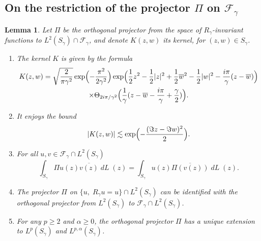 \documentclass[10pt]{amsart}
\DeclareMathOperator{\dL}{\mathit{dL}}
\newtheorem{lemme}[theorem]{Lemma}
\theoremstyle{definition}
\let\EE\exp
\let\ov\overline
\let\Subsection\subsection\let\Subsubsection\subsubsection
\begin{document}
\Subsection{On the restriction of the projector $\Pi$ on $\mathcal{F}_\gamma$}

\begin{lemme}\label{lemme_extension} Let $\Pi$ be the orthogonal projector from the space of $R_\gamma$-invariant functions to ${L^2(S_\gamma) \cap \mathcal{F}_{\gamma}}$, and denote $K(z,w)$ its kernel, for $(z,w) \in S_\gamma$.
\begin{enumerate}
\item\label{lemme_extensioni} The kernel $K$ is given by the formula
\begin{multline}\label{perio}
K(z,w)=\sqrt{\frac{2}{\pi \gamma^2}} \EE\Bigl({-\frac{\pi^2}{2\gamma^2}} \Bigr)\EE\Bigl({\frac{1}{2} z^2 - \frac{1}{2} |z|^2+\frac{1}{2} \ov{w}^2 - \frac{1}{2} |w|^2 -\frac{i\pi}{\gamma} (z- \ov{w})}\Bigr)\\
\times \Theta_{{2i\pi}/{\gamma^2}}\Bigl(\frac{1}{\gamma}(z-\ov{w}-\frac{i\pi}{\gamma}+\frac{\gamma}{2})\Bigr).
\end{multline}
\item\label{lemme_extensionii} It enjoys the bound
\begin{equation}\label{borneK}
|K(z, w)| \lesssim \EE\Bigl(-\frac{(\Im z-\Im w)^2}2\Bigr).
\end{equation}
\item\label{lemme_extensioniii} For all $u,v\in \mathcal{F}_{\gamma} \cap L^2(S_{\gamma})$
\begin{equation}\label{aa}
\int_{S_{\gamma}} \Pi u(z) \ov{v(z)}\dL(z)= \int_{S_{\gamma}} u(z) \ov{\Pi(v(z))}\dL(z).
\end{equation}
\item\label{lemme_extensioniv} The projector $\Pi$ on $\{ u, \; R_\gamma u = u \} \cap L^2(S_\gamma)$ can be identified with the orthogonal projector from $L^2(S_\gamma)$ to $\mathcal{F}_\gamma \cap L^2(S_\gamma)$.
\item\label{lemme_extensionv} For any $p \geq 2$ and $\alpha \geq 0$, the orthogonal projector $\Pi$ has a unique extension to $L^p(S_\gamma)$ and $L^{p,\alpha}(S_\gamma)$.
\end{enumerate}
\end{lemme}
\end{document}

